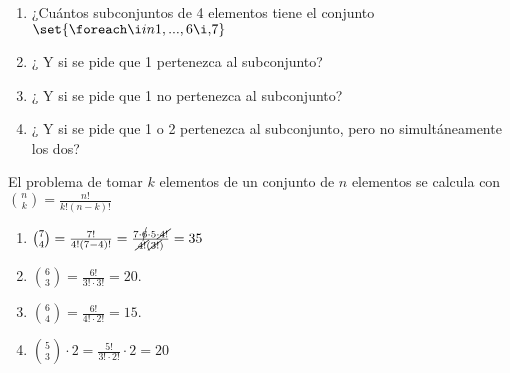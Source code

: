 \ejercicio

\begin{enumerate}[label=\roman*)]
	\item ¿Cuántos subconjuntos de 4 elementos tiene el conjunto $\set{\foreach \i in {1,...,6}{ \i, }7} $
	\item ¿ Y si se pide que 1 pertenezca al subconjunto?
	\item ¿ Y si se pide que 1 no pertenezca al subconjunto?
	\item ¿ Y si se pide que 1 o 2 pertenezca al subconjunto, pero no simultáneamente los dos?
\end{enumerate}

\separadorCorto

El problema de tomar $k$ elementos de un conjunto de $n$ elementos se calcula con $\binom{n}{k} = \frac{n!}{k!(n-k)!}$

\begin{enumerate}[label=\roman*)]
	\item  $\binom{7}{4} = \frac{7!}{4!(7-4)!} = \frac{7\cdot \cancel{6} \cdot 5 \cdot \cancel{4!}}{\cancel{4!}(\cancel{3!})} = 35$

	\item $\binom{6}{3} = \frac{6!}{3!\cdot 3!} = 20$.

	\item $\binom{6}{4} = \frac{6!}{4!\cdot 2!} = 15$.

	\item $\binom{5}{3} \cdot 2 = \frac{5!}{3!\cdot 2!} \cdot 2 = 20$
\end{enumerate}
